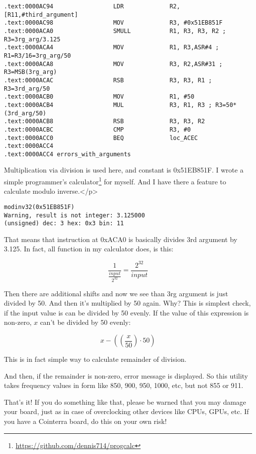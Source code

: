 \begin{lstlisting}
.text:0000AC94                 LDR             R2, [R11,#third_argument]
.text:0000AC98                 MOV             R3, #0x51EB851F
.text:0000ACA0                 SMULL           R1, R3, R3, R2 ; R3=3rg_arg/3.125
.text:0000ACA4                 MOV             R1, R3,ASR#4 ; R1=R3/16=3rg_arg/50
.text:0000ACA8                 MOV             R3, R2,ASR#31 ; R3=MSB(3rg_arg)
.text:0000ACAC                 RSB             R3, R3, R1 ; R3=3rd_arg/50
.text:0000ACB0                 MOV             R1, #50
.text:0000ACB4                 MUL             R3, R1, R3 ; R3=50*(3rd_arg/50)
.text:0000ACB8                 RSB             R3, R3, R2
.text:0000ACBC                 CMP             R3, #0
.text:0000ACC0                 BEQ             loc_ACEC
.text:0000ACC4
.text:0000ACC4 errors_with_arguments
\end{lstlisting}

Multiplication via division is used here, and constant is 0x51EB851F.
I wrote a simple programmer's calculator\footnote{\url{https://github.com/dennis714/progcalc}} for myself.
And I have there a feature to calculate modulo inverse.</p>

\begin{lstlisting}
modinv32(0x51EB851F)
Warning, result is not integer: 3.125000
(unsigned) dec: 3 hex: 0x3 bin: 11
\end{lstlisting}

That means that  instruction at 0xACA0 is basically divides 3rd argument by 3.125.
In fact, all  function in my calculator does, is this:

\[
\frac{1}{\frac{input}{2^{32}}} = \frac{2^{32}}{input}
\]

Then there are additional shifts and now we see than 3rg argument is just divided by 50.
And then it's multiplied by 50 again.
Why?
This is simplest check, if the input value is can be divided by 50 evenly.
If the value of this expression is non-zero, $x$ can't be divided by 50 evenly:

\[
x-((\frac{x}{50}) \cdot 50)
\]

This is in fact simple way to calculate remainder of division.

And then, if the remainder is non-zero, error message is displayed. So this utility takes frequency values in form like 850, 900, 950, 1000, etc, but not 855 or 911.

That's it! If you do something like that, please be warned that you may damage your board, just as in case of overclocking other devices like CPUs, GPUs, etc.
If you have a Cointerra board, do this on your own risk!

